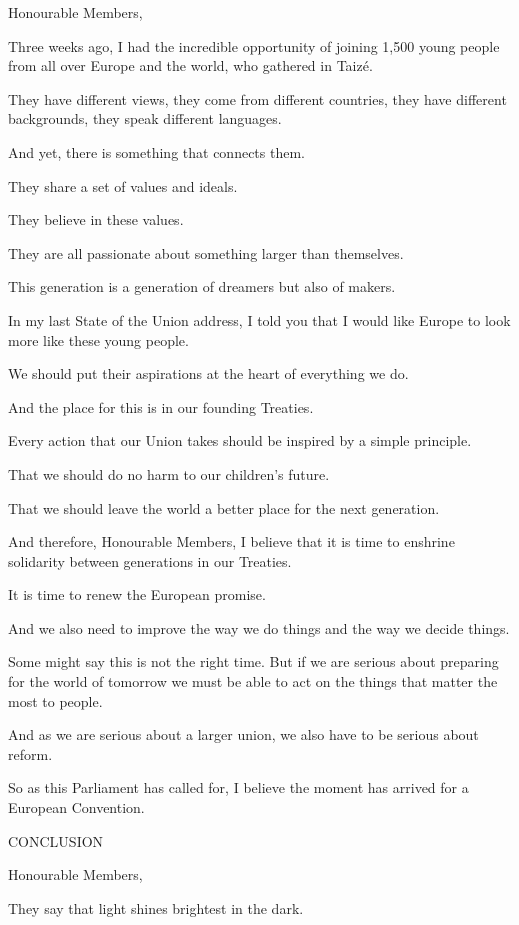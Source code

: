 \documentclass[a4paper,11pt]{article}
\begin{document}
 

Honourable Members,

Three weeks ago, I had the incredible opportunity of joining 1,500 young people from all over Europe and the world, who gathered in Taizé.

They have different views, they come from different countries, they have different backgrounds, they speak different languages.

And yet, there is something that connects them.

They share a set of values and ideals.

They believe in these values.

They are all passionate about something larger than themselves.

This generation is a generation of dreamers but also of makers.

In my last State of the Union address, I told you that I would like Europe to look more like these young people.

We should put their aspirations at the heart of everything we do.

And the place for this is in our founding Treaties.

Every action that our Union takes should be inspired by a simple principle.

That we should do no harm to our children's future.

That we should leave the world a better place for the next generation.

And therefore, Honourable Members, I believe that it is time to enshrine solidarity between generations in our Treaties.

It is time to renew the European promise.

And we also need to improve the way we do things and the way we decide things.

Some might say this is not the right time. But if we are serious about preparing for the world of tomorrow we must be able to act on the things that matter the most to people.

And as we are serious about a larger union, we also have to be serious about reform.

So as this Parliament has called for, I believe the moment has arrived for a European Convention.

 

CONCLUSION

Honourable Members,

They say that light shines brightest in the dark.
\end{document}
